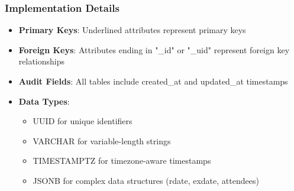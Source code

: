 \subsubsection{Implementation Details}

\begin{itemize}
    \item \textbf{Primary Keys}: Underlined attributes represent primary keys
    \item \textbf{Foreign Keys}: Attributes ending in "\_id" or "\_uid" represent foreign key relationships
    \item \textbf{Audit Fields}: All tables include created\_at and updated\_at timestamps
    \item \textbf{Data Types}:
          \begin{itemize}
              \item UUID for unique identifiers
              \item VARCHAR for variable-length strings
              \item TIMESTAMPTZ for timezone-aware timestamps
              \item JSONB for complex data structures (rdate, exdate, attendees)
          \end{itemize}
\end{itemize}

